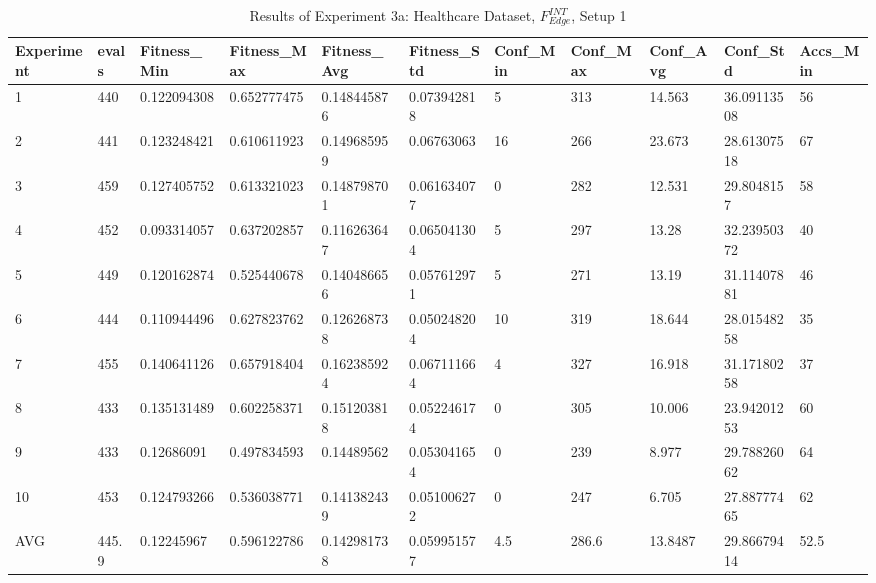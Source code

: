 		\begin{table}[H]
			\caption{Results of Experiment 3a: Healthcare Dataset, $F_{Edge}^{INT}$, Setup 1}
			\label{tab:A_Exp3b_Data}
			\begin{adjustbox}{max width=380pt,keepaspectratio,angle=90}
				\begin{tabular}{|l|l|l|l|l|l|l|l|l|l|l|}
					\rowcolor[HTML]{EFEFEF} 
					\hline
					Experiment & evals & Fitness\_Min & Fitness\_Max & Fitness\_Avg & Fitness\_Std & Conf\_Min & Conf\_Max & Conf\_Avg & Conf\_Std   & Accs\_Min \\ \hline
					1          & 440   & 0.122094308  & 0.652777475  & 0.148445876  & 0.073942818  & 5         & 313       & 14.563    & 36.09113508 & 56        \\ \hline
					2          & 441   & 0.123248421  & 0.610611923  & 0.149685959  & 0.06763063   & 16        & 266       & 23.673    & 28.61307518 & 67        \\ \hline
					3          & 459   & 0.127405752  & 0.613321023  & 0.148798701  & 0.061634077  & 0         & 282       & 12.531    & 29.8048157  & 58        \\ \hline
					4          & 452   & 0.093314057  & 0.637202857  & 0.116263647  & 0.065041304  & 5         & 297       & 13.28     & 32.23950372 & 40        \\ \hline
					5          & 449   & 0.120162874  & 0.525440678  & 0.140486656  & 0.057612971  & 5         & 271       & 13.19     & 31.11407881 & 46        \\ \hline
					6          & 444   & 0.110944496  & 0.627823762  & 0.126268738  & 0.050248204  & 10        & 319       & 18.644    & 28.01548258 & 35        \\ \hline
					7          & 455   & 0.140641126  & 0.657918404  & 0.162385924  & 0.067111664  & 4         & 327       & 16.918    & 31.17180258 & 37        \\ \hline
					8          & 433   & 0.135131489  & 0.602258371  & 0.151203818  & 0.052246174  & 0         & 305       & 10.006    & 23.94201253 & 60        \\ \hline
					9          & 433   & 0.12686091   & 0.497834593  & 0.14489562   & 0.053041654  & 0         & 239       & 8.977     & 29.78826062 & 64        \\ \hline
					10         & 453   & 0.124793266  & 0.536038771  & 0.141382439  & 0.051006272  & 0         & 247       & 6.705     & 27.88777465 & 62        \\ \hline\hline
					AVG        & 445.9 & 0.12245967   & 0.596122786  & 0.142981738  & 0.059951577  & 4.5       & 286.6     & 13.8487   & 29.86679414 & 52.5      \\ \hline

\end{tabular}
\end{adjustbox}
\end{table}
